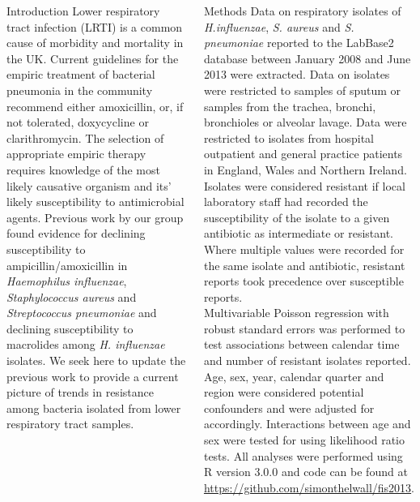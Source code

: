 \documentclass[final, 14pt]{beamer}
\begin{document}
\begin{frame}
\begin{columns}[t]
 \begin{minipage}[T]{.95\textwidth} %
  \begin{block}{Introduction}
  Lower respiratory tract infection (LRTI) is a common cause of morbidity and mortality in the UK. \citep{Davies2012}
   Current guidelines for the empiric treatment of bacterial pneumonia in the community recommend either amoxicillin, or, if not tolerated, doxycycline or clarithromycin. \citep{Lim2009}
   The selection of appropriate empiric therapy requires knowledge of the most likely causative organism and its' likely susceptibility to antimicrobial agents.
   Previous work by our group found evidence for declining susceptibility to ampicillin/amoxicillin in \textit{Haemophilus influenzae}, \textit{Staphylococcus aureus} and \textit{Streptococcus pneumoniae} and declining susceptibility to macrolides among \textit{H. influenzae} isolates. \citep{Blackburn2011}
   We seek here to update the previous work to provide a current picture of trends in resistance among bacteria isolated from lower respiratory tract samples. \\
   \end{block}
  
  \begin{block}{Methods}
   Data on respiratory isolates of \textit{H.influenzae}, \textit{S. aureus} and \textit{S. pneumoniae} reported to the LabBase2 database between January 2008 and June 2013 were extracted. 
   Data on isolates were restricted to samples of sputum or samples from the trachea, bronchi, bronchioles or alveolar lavage.
   Data were restricted to isolates from hospital outpatient and general practice patients in England, Wales and Northern Ireland.\\
   Isolates were considered resistant if local laboratory staff had recorded the susceptibility of the isolate to a given antibiotic as intermediate or resistant. 
   Where multiple values were recorded for the same isolate and antibiotic, resistant reports took precedence over susceptible reports. \\
   Multivariable Poisson regression with robust standard errors was performed to test associations between calendar time and number of resistant isolates reported.
   Age, sex, year, calendar quarter and region were considered potential confounders and were adjusted for accordingly.
   Interactions between age and sex were tested for using likelihood ratio tests. 
   All analyses were performed using R version 3.0.0 and code can be found at \url{https://github.com/simonthelwall/fis2013}.
  \end{block}
  

\end{minipage}
\end{columns}
\end{frame}
\end{document}
